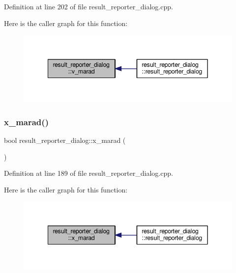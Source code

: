 Definition at line 202 of file result\+\_\+reporter\+\_\+dialog.\+cpp.

Here is the caller graph for this function\+:\nopagebreak
\begin{figure}[H]
\begin{center}
\leavevmode
\includegraphics[width=342pt]{classresult__reporter__dialog_a4f4f6760697c697cdeef2a3103f9a0d9_icgraph}
\end{center}
\end{figure}
\mbox{\label{classresult__reporter__dialog_a1c5c814b57242606e724258c49b8fb47}} 
\subsubsection{\texorpdfstring{x\+\_\+marad()}{x\_marad()}}
{\footnotesize\ttfamily bool result\+\_\+reporter\+\_\+dialog\+::x\+\_\+marad (\begin{DoxyParamCaption}{ }\end{DoxyParamCaption})\hspace{0.3cm}{\ttfamily [private]}}



Definition at line 189 of file result\+\_\+reporter\+\_\+dialog.\+cpp.

Here is the caller graph for this function\+:\nopagebreak
\begin{figure}[H]
\begin{center}
\leavevmode
\includegraphics[width=342pt]{classresult__reporter__dialog_a1c5c814b57242606e724258c49b8fb47_icgraph}
\end{center}
\end{figure}


